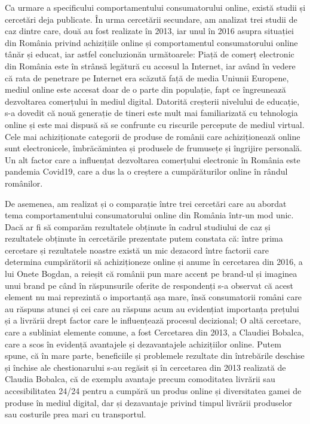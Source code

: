 \documentclass[a4paper, 12pt]{article}
\begin{document}
	\quad  Ca urmare a specificului comportamentului consumatorului online, există studii și cercetări deja publicate. În urma cercetării secundare, am analizat trei studii de caz  dintre care, două au fost realizate în 2013, iar unul în  2016 asupra situației din România privind achizițiile online și comportamentul consumatorului online tânăr și educat, iar astfel concluzionăn următoarele: Piață de comerț electronic din România este în strânsă legătură cu accesul la Internet, iar având în vedere că rata de penetrare pe Internet era scăzută față de media Uniunii Europene, mediul online este accesat doar de o parte din populație, fapt ce îngreunează dezvoltarea comerțului  în mediul digital. Datorită creșterii nivelului de educație, s-a dovedit că nouă generație de tineri este mult mai familiarizată cu tehnologia online și este mai dispusă să se confrunte cu riscurile percepute de mediul virtual. Cele mai achiziționate categorii de produse de românii care achiziționează online sunt electronicele, îmbrăcămintea și produsele de frumusețe și îngrijire personală. Un alt factor care a influențat dezvoltarea comerțului electronic în România este pandemia Covid19, care a dus la o creștere a cumpărăturilor online în rândul românilor. 
	
	\quad De asemenea, am realizat și o comparație între trei cercetări care au abordat tema comportamentului consumatorului online din România într-un mod unic. Dacă ar fi să comparăm rezultatele obținute în cadrul studiului de caz și rezultatele obținute în cercetările prezentate putem constata că: între prima cercetare și rezultatele noastre există un mic dezacord între factorii care determina cumpărătorii să achiziționeze online și anume în cercetarea din 2016, a lui Onete Bogdan,  a reieșit că românii pun mare accent pe brand-ul și imaginea unui brand pe când în răspunsurile oferite de respondenți s-a observat că acest element nu mai reprezintă o importanță așa mare, însă consumatorii români care au răspuns atunci și cei care au răspuns acum au evidențiat importanța prețului și a livrării drept factor care le influențează procesul decizional; O altă cercetare, care a subliniat elemente comune, a fost Cercetarea din 2013, a Claudiei Bobalca, care a scos în evidență avantajele și dezavantajele achizițiilor online. Putem spune, că în mare parte, beneficiile și problemele rezultate din întrebările deschise și închise ale chestionarului s-au regăsit și în cercetarea din 2013 realizată de Claudia Bobalca, că de exemplu avantaje precum comoditatea livrării sau accesibilitatea 24/24 pentru a cumpără un produs online și diversitatea gamei de produse în mediul digital, dar și dezavantaje privind timpul livrării produselor sau costurile prea mari cu transportul.
	
\end{document}
